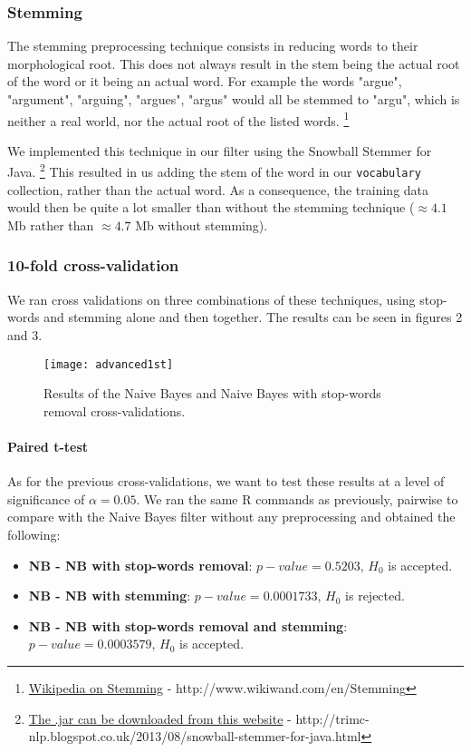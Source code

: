 \documentclass[12pt,a4paper]{report}
\begin{document}
\subsubsection{Stemming} 
The stemming preprocessing technique consists in reducing words to their morphological root. This does not always result in the stem being the actual root of the word or it being an actual word. For example the words "argue", "argument", "arguing", "argues", "argus" would all be stemmed to "argu", which is neither a real world, nor the actual root of the listed words.
\footnote{\href{http://www.wikiwand.com/en/Stemming}{Wikipedia on Stemming} -  http://www.wikiwand.com/en/Stemming} 

We implemented this technique in our filter using the Snowball Stemmer for Java.
\footnote{\href{http://trimc-nlp.blogspot.co.uk/2013/08/snowball-stemmer-for-java.html}{The .jar can be downloaded from this website} -  http://trimc-nlp.blogspot.co.uk/2013/08/snowball-stemmer-for-java.html}
This resulted in us adding the stem of the word in our \texttt{vocabulary} collection, rather than the actual word. As a consequence, the training data would then be quite a lot smaller than without the stemming technique ($\approx 4.1$ Mb rather than $\approx 4.7$ Mb without stemming).

\subsubsection{10-fold cross-validation} 

We ran cross validations on three combinations of these techniques, using stop-words and stemming alone and then together. The results can be seen in figures 2 and 3.

\begin{figure}
\texttt{[image: advanced1st]}
\centering
\caption{Results of the Naive Bayes and Naive Bayes with stop-words removal cross-validations.}
\end{figure}

\paragraph*{Paired t-test}
As for the previous cross-validations, we want to test these results at a level of significance of $\alpha = 0.05$. We ran the same R commands as previously, pairwise to compare with the Naive Bayes filter without any preprocessing and obtained the following:
\begin{itemize}
\item \textbf{NB - NB with stop-words removal}: $p-value = 0.5203$, $H_0$ is accepted.
\item \textbf{NB - NB with stemming}: $p-value = 0.0001733$, $H_0$ is rejected.
\item \textbf{NB - NB with stop-words removal and stemming}: \linebreak $p-value = 0.0003579$, $H_0$ is accepted.
\end{itemize}
\end{document}
